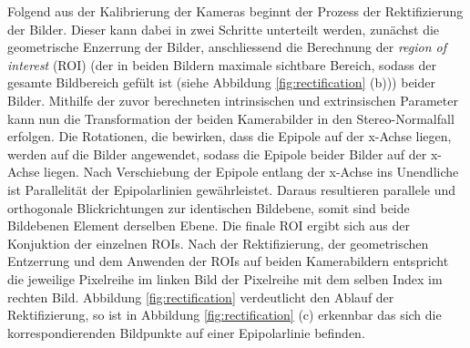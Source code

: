 \noindent
Folgend aus der Kalibrierung der Kameras beginnt der Prozess der Rektifizierung der Bilder. Dieser kann dabei in zwei Schritte unterteilt werden, zunächst die geometrische Enzerrung der Bilder, anschliessend die Berechnung der \emph{region of interest} (ROI) (der in beiden Bildern maximale sichtbare Bereich, sodass der gesamte Bildbereich gefült ist (siehe Abbildung \ref{fig:rectification} (b))) beider Bilder. Mithilfe der zuvor berechneten intrinsischen und extrinsischen Parameter kann nun die Transformation der beiden Kamerabilder in den Stereo-Normalfall erfolgen. Die Rotationen, die bewirken, dass die Epipole auf der x-Achse liegen, werden auf die Bilder angewendet, sodass die Epipole beider Bilder auf der x-Achse liegen. Nach Verschiebung der Epipole entlang der x-Achse ins Unendliche ist Parallelität der Epipolarlinien gewährleistet. Daraus resultieren parallele und orthogonale Blickrichtungen zur identischen Bildebene, somit sind beide Bildebenen Element derselben Ebene. Die finale ROI ergibt sich aus der Konjuktion der einzelnen ROIs. Nach der Rektifizierung, der geometrischen Entzerrung und dem Anwenden der ROIs auf beiden Kamerabildern entspricht die jeweilige Pixelreihe im linken Bild der Pixelreihe mit dem selben Index im rechten Bild. Abbildung \ref{fig:rectification} verdeutlicht den Ablauf der Rektifizierung, so ist in Abbildung \ref{fig:rectification} (c) erkennbar das sich die korrespondierenden Bildpunkte auf einer Epipolarlinie befinden.\\

